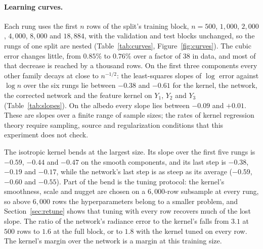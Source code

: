 \documentclass[11pt]{article}
\newcommand{\1}{\mathbf{1}}
\begin{document}
\paragraph{Learning curves.} Each rung uses the first $n$ rows of the split's training block,
$n = 500$, $1{,}000$, $2{,}000$, $4{,}000$, $8{,}000$ and $18{,}884$, with the validation and test
blocks unchanged, so the rungs of one split are nested (Table~\ref{tab:curves},
Figure~\ref{fig:curves}). The cubic error changes little, from $0.85\%$ to $0.76\%$ over a
factor of 38 in data, and most of that decrease is reached by a thousand rows. On the first three
components every other family decays at close to $n^{-1/2}$: the least-squares slopes of $\log$
error against $\log n$ over the six rungs lie between $-0.38$ and $-0.61$ for the kernel, the
network, the corrected network and the feature kernel on $Y_1$, $Y_2$ and $Y_3$
(Table~\ref{tab:slopes}). On the albedo every slope lies between $-0.09$ and $+0.01$. These are
slopes over a finite range of sample sizes; the rates of kernel regression theory require
sampling, source and regularization conditions \cite{cdv,fs} that this experiment does not
check.

\begin{table}[t]
\centering\small
\resizebox{\textwidth}{!}{}
\caption{Learning-curve exponents: the least-squares slope of $\log$ error against $\log n$ over
the six rungs of Table~\ref{tab:curves}, and the slope of the last step alone, from $8{,}000$ to
$18{,}884$ rows, per family and component.}
\label{tab:slopes}
\end{table}

The isotropic kernel bends at the largest size. Its slope over the first five rungs is $-0.59$,
$-0.44$ and $-0.47$ on the smooth components, and its last step is $-0.38$, $-0.19$ and $-0.17$,
while the network's last step is as steep as its average ($-0.59$, $-0.60$ and $-0.55$). Part of
the bend is the tuning protocol: the kernel's smoothness, scale and nugget are chosen on a
$6{,}000$-row subsample at every rung, so above $6{,}000$ rows the hyperparameters belong to a
smaller problem, and Section~\ref{sec:retune} shows that tuning with every row recovers much of
the lost slope. The ratio of the network's radiance error to the kernel's falls from $3.1$ at
$500$ rows to $1.6$ at the full block, or to $1.8$ with the kernel tuned on every row. The
kernel's margin over the network is a margin at this training size.
\end{document}
